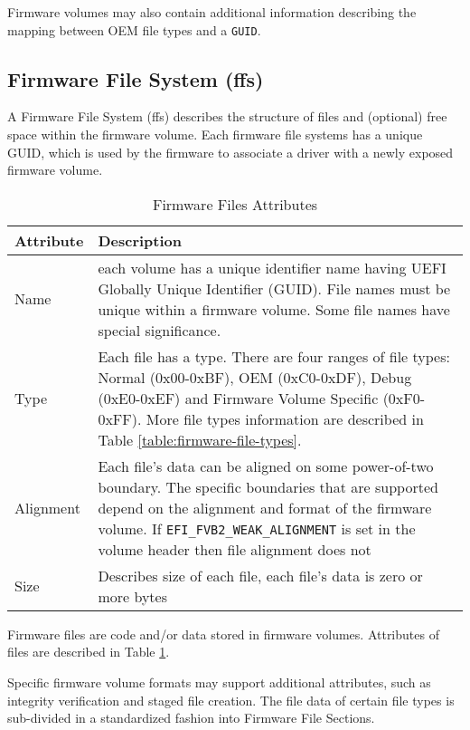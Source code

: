 Firmware volumes may also contain additional information describing the mapping between OEM
file types and a \verb|GUID|.

\subsection{Firmware File System (\gls{ffs})}
A Firmware File System (\gls{ffs}) describes the structure of files and (optional) free space within the firmware volume. Each firmware file systems has a unique GUID, which is used by the firmware to associate a driver with a newly exposed firmware volume.


\begin{table}[h]
	\centering
	\renewcommand{\arraystretch}{2}
	\caption{Firmware Files Attributes}\label{table:firmware-files-attributes}
	\begin{tabular}{p{4cm} | p{11cm}}
		\textbf{Attribute} & \textbf{Description}
		\\ \hline \hline
		Name & each volume has a unique identifier name having UEFI Globally Unique Identifier (GUID). File names must be unique within a firmware volume. Some file names have special significance.
		\\ \hline
		Type & Each file has a type. There are four ranges of file types: Normal (0x00-0xBF), OEM	(0xC0-0xDF), Debug (0xE0-0xEF) and Firmware Volume Specific (0xF0-0xFF). More file types information are described in Table \ref{table:firmware-file-types}.
		\\ \hline
		Alignment & Each file’s data can be aligned on some power-of-two boundary. The specific boundaries that are supported depend on the alignment and format of the firmware volume. If \verb|EFI_FVB2_WEAK_ALIGNMENT| is set in the volume header then file alignment does not
		\\ \hline
		Size & Describes size of each file, each file's data is zero or more bytes
		\\ \hline
	\end{tabular}
\end{table}

Firmware files are code and/or data stored in firmware volumes. Attributes of files are described in Table \ref{table:firmware-files-attributes}.

Specific firmware volume formats may support additional attributes, such as integrity verification and staged file creation. The file data of certain file types is sub-divided in a standardized fashion into Firmware File Sections.

